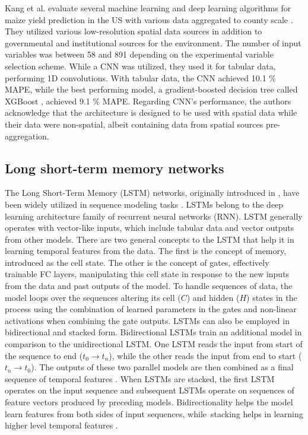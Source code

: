 Kang et al. evaluate several machine learning and deep learning algorithms for maize yield prediction in the US with various data aggregated to county scale \cite{Kang2020}. They utilized various low-resolution spatial data sources in addition to governmental and institutional sources for the environment. The number of input variables was between 58 and 891 depending on the experimental variable selection scheme. While a CNN was utilized, they used it for tabular data, performing 1D convolutions. With tabular data, the CNN achieved 10.1 \% MAPE, while the best performing model, a gradient-boosted decision tree called XGBoost \cite{Chen2016}, achieved 9.1 \% MAPE. Regarding CNN's performance, the authors acknowledge that the architecture is designed to be used with spatial data while their data were non-spatial, albeit containing data from spatial sources pre-aggregation.


\subsection{Long short-term memory networks}
\label{subsec:lstm-review}

The Long Short-Term Memory (LSTM) networks, originally introduced in \cite{Hochreiter1997}, have been widely utilized in sequence modeling tasks \cite{Schmidhuber2014}. LSTMs belong to the deep learning architecture family of recurrent neural networks (RNN). LSTM generally operates with vector-like inputs, which include tabular data and vector outputs from other models. There are two general concepts to the LSTM that help it in learning temporal features from the data. The first is the concept of memory, introduced as the cell state. The other is the concept of gates, effectively trainable FC layers, manipulating this cell state in response to the new inputs from the data and past outputs of the model. To handle sequences of data, the model loops over the sequences altering its cell ($C$) and hidden ($H$) states in the process using the combination of learned parameters in the gates and non-linear activations when combining the gate outputs. LSTMs can also be employed in bidirectional and stacked form. Bidirectional LSTMs train an additional model in comparison to the unidirectional LSTM. One LSTM reads the input from start of the sequence to end ($t_0 \to t_n$), while the other reads the input from end to start ($t_n \to t_0$). The outputs of these two parallel models are then combined as a final sequence of temporal features \cite{Schuster1997}. When LSTMs are stacked, the first LSTM operates on the input sequence and subsequent LSTMs operate on sequences of feature vectors produced by preceding models. Bidirectionality helps the model learn features from both sides of input sequences, while~stacking helps in learning higher level temporal features \cite{Graves2013}. 

